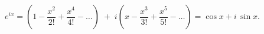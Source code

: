 \[
e^{ix} = \left(1 - \frac{x^2}{2!} + \frac{x^4}{4!} - \dots\right)
\;+\; i\left(x - \frac{x^3}{3!} + \frac{x^5}{5!} - \dots\right)
= \cos x + i\,\sin x.
\]

\medskip


